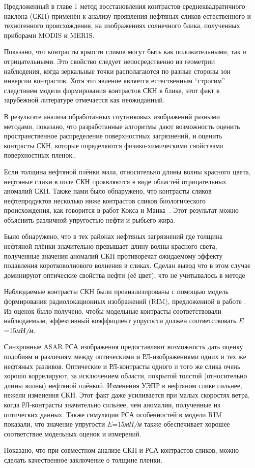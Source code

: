 Предложенный в главе 1 метод восстановления контрастов среднеквадратичного наклона (СКН) применён к анализу проявления нефтяных сликов естественного и техногенного происхождения, на изображениях солнечного блика, полученных приборами MODIS и MERIS.

Показано, что контрасты яркости сликов могут быть как положительными, так и отрицательными. Это свойство следует непосредственно из геометрии наблюдения, когда зеркальные точки располагаются по разные стороны зон инверсии контрастов. Хотя это явление является естественным ``строгим'' следствием модели формирования контрастов СКН в блике, этот факт в зарубежной литературе отмечается как неожиданный.

В результате анализа обработанных спутниковых изображений разными методами, показано, что разработанные алгоритмы дают возможность оценить пространственное распределение поверхностных загрязнений, и оценить контрасты СКН, которые определяются физико-химическими свойствами поверхностных пленок..

Если толщина нефтяной плёнки мала, относительно длины волны красного цвета, нефтяные слики в поле СКН проявляются в виде  областей отрицательных аномалий СКН. Также нами было обнаружено, что контрасты сликов нефтепродуктов несколько ниже контрастов сликов биологического происхождения, как говорится в работ Кокса и Манка~\citep{Cox1954, Cox1954a, Cox1956}. Этот результат можно объяснить различной упругостью нефти и рыбьего жира.

Было обнаружено, что в тех районах нефтяных загрязнений где толщина нефтяной плёнки значительно превышает длину волны красного света, полученные значения аномалий СКН противоречат ожидаемому эффекту подавления коротковолнового волнения в сликах. Сделан вывод что в этом случае доминируют оптические свойства нефти (её цвет), что не учитывалось в методе

Наблюдаемые контрасты СКН были проанализированы с помощью модель формирования радиолокационных изображений (RIM), предложенной в работе  \citep{Kudryavtsev2005, 2008}. Из оценок было получено, чтобы модельные контрасты соответствовали наблюдаемым, эффективный коэффициент упругости должен соответствовать $E$=15\textit{мН/м.}

Синхронные ASAR РСА изображения предоставляют возможность дать оценку подобиям и различиям между оптическими и РЛ-изображениями одних и тех же нефтяных разливов. Оптические и РЛ-контрасты одного и того же слика очень хорошо коррелируют, за исключением области, покрытой толстой (относительно длины волны) нефтяной плёнкой. Изменения УЭПР в нефтяном слике сильнее, нежели изменения СКН. Этот факт даже усиливается при малых скоростях ветра, когда РЛ-контрасты значительно сильнее, чем аномалии, полученные из оптических данных. Также симуляции РСА особенностей в модели RIM показали, что значение упругости $E$=15\textit{мН/м }также обеспечивает хорошее соответствие модельных оценок и измерений.

Показано, что при совместном анализе СКН и РСА контрастов сликов, можно сделать качественное заключение о толщине пленки.




\clearpage